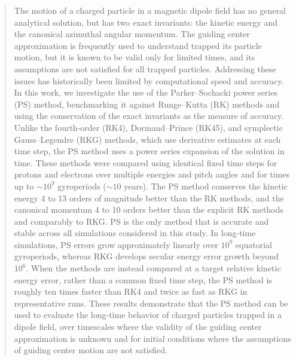 \documentclass[draft]{agujournal2019}
\begin{document}
%
%


\begin{abstract}
The motion of a charged particle in a magnetic dipole field has no general analytical solution, but has two exact invariants: the kinetic energy and the canonical azimuthal angular momentum. 
The guiding center approximation is frequently used to understand trapped its particle motion, but it is known to be valid only for limited times, and its assumptions are not satisfied for all trapped particles. Addressing these issues has historically been limited by computational speed and accuracy.
In this work, we investigate the use of the Parker--Sochacki power series (PS) method, benchmarking it against Runge--Kutta (RK) methods and using the conservation of the exact invariants as the measure of accuracy. Unlike the fourth-order (RK4), Dormand--Prince (RK45), and symplectic Gauss--Legendre (RKG) methods, which use derivative estimates at each time step, the PS method uses a power series expansion of the solution in time. These methods were compared using identical fixed time steps for protons and electrons over multiple energies and pitch angles and for times up to ${\sim}10^9$ gyroperiods (${\sim}10$ years). The PS method conserves the kinetic energy 4 to 13 orders of magnitude better than the RK methods, and the canonical momentum 4 to 10 orders better than the explicit RK methods and comparably to RKG. PS is the only method that is accurate and stable across all simulations considered in this study. In long-time simulations, PS errors grow approximately linearly over $10^9$ equatorial gyroperiods, whereas RKG develops secular energy error growth beyond $10^6$. When the methods are instead compared at a target relative kinetic energy error, rather than a common fixed time step, the PS method is roughly ten times faster than RK4 and twice as fast as RKG in representative runs. These results demonstrate that the PS method can be used to evaluate the long-time behavior of charged particles trapped in a dipole field, over timescales where the validity of the guiding center approximation is unknown and for initial conditions where the assumptions of guiding center motion are not satisfied.
\end{abstract}
\end{document}
